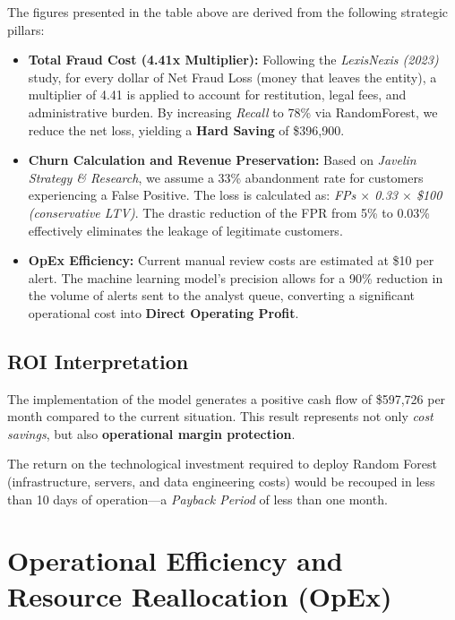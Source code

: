 \documentclass[12pt,a4paper]{report}
\begin{document}
The figures presented in the table above are derived from the following strategic pillars:

\begin{itemize}
    \item \textbf{Total Fraud Cost (4.41x Multiplier):} Following the \textit{LexisNexis (2023)} study, for every dollar of Net Fraud Loss (money that leaves the entity), a multiplier of 4.41 is applied to account for restitution, legal fees, and administrative burden. By increasing \textit{Recall} to 78\% via RandomForest, we reduce the net loss, yielding a \textbf{Hard Saving} of \$396,900.
    
    \item \textbf{Churn Calculation and Revenue Preservation:} Based on \textit{Javelin Strategy \& Research}, we assume a 33\% abandonment rate for customers experiencing a False Positive. The loss is calculated as: \textit{FPs $\times$ 0.33 $\times$ \$100 (conservative LTV)}. The drastic reduction of the FPR from 5\% to 0.03\% effectively eliminates the leakage of legitimate customers.
    
    \item \textbf{OpEx Efficiency:} Current manual review costs are estimated at \$10 per alert. The machine learning model's precision allows for a 90\% reduction in the volume of alerts sent to the analyst queue, converting a significant operational cost into \textbf{Direct Operating Profit}.
\end{itemize}



\subsection{ROI Interpretation}

The implementation of the model generates a positive cash flow of \$597,726 per month compared to the current situation. This result represents not only \textit{cost savings}, but also \textbf{operational margin protection}.  

The return on the technological investment required to deploy Random Forest (infrastructure, servers, and data engineering costs) would be recouped in less than 10 days of operation—a \textit{Payback Period} of less than one month.

\section{Operational Efficiency and Resource Reallocation (OpEx)}
\end{document}
